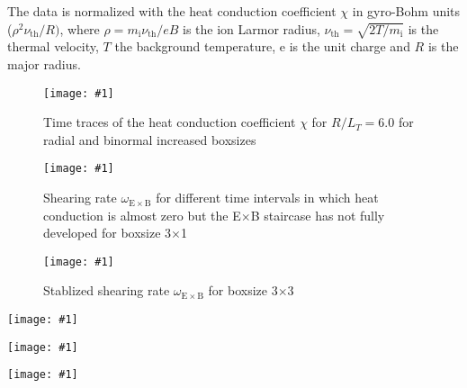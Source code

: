 \documentclass[aip, amsmath, amssymb, reprint, twocolumn]{revtex4-1}
\newcommand{\includegraphicsOneCol}[3]{
	\begin{figure}[ht]
		\texttt{[image: \#1]}
		\caption{#2}
  	\end{figure}
	\label{#3}
  	\increasecounter{fig}{1}
}
\newcommand{\includegraphicsTwoCol}[3]{
	\begin{figure*}
    	\texttt{[image: \#1]}
		\caption{#2}
	\end{figure*}
	\label{#3}
	\increasecounter{fig}{2}
}
\begin{document}


The data is normalized with the heat conduction coefficient $\chi$ in gyro-Bohm units ($\rho^2\nu_{\mathrm{th}}/R)$, where $\rho = m_\mathrm{i}\nu_{\mathrm{th}}/eB$ is the ion Larmor radius, $\nu_{\mathrm{th}} = \sqrt{2T/m_\mathrm{i}}$ is the thermal velocity, $T$ the background temperature, e is the unit charge and $R$ is the major radius. 

\includegraphicsOneCol{Comparison/Boxsize/S6_rlt6.0_boxsize1x1-2x2-3x3_Ns16_Nvpar48_Nmu9_eflux_comparison.pdf}{
	Time traces of the heat conduction coefficient $\chi$ for $R/L_T = 6.0$ for radial and binormal increased boxsizes
}{fig:eflux-1x1-2x2-3x3-comparison}

\includegraphicsOneCol{S6_rlt6.0/boxsize3x1/Ns16/Nvpar48/Nmu9/S6_rlt6.0_boxsize3x1_Ns16_Nvpar48_Nmu9_wexb_selection.pdf}{
	Shearing rate $\omega_{\mathrm{E \times B}}$ for different time intervals in which heat conduction is almost zero but the E$\times$B staircase has not fully developed for boxsize 3$\times$1
}{fig:wexb-3x1-selection}

\includegraphicsOneCol{S6_rlt6.0/boxsize3x3/Ns16/Nvpar48/Nmu9/S6_rlt6.0_boxsize3x3_Ns16_Nvpar48_Nmu9_wexb_selection.pdf}{
	Stablized shearing rate $\omega_{\mathrm{E \times B}}$ for boxsize 3$\times$3
}{fig:wexb-3x3-stable}

\includegraphicsTwoCol{Comparison/Boxsize/S6_rlt6.0_boxsize2x1-2-3x1-3_Ns16_Nvpar48_Nmu9_eflux_comparison.pdf}{
	Comparison of time traces of the heat conduction coefficient $\chi$ for $R/L_T = 6.0$ for boxsize 2$\times$1 compared to 2$\times$2 and 3$\times$1 compared to 3$\times$3
}{fig:eflux-2x1-2-3x1-3-comparison}

\includegraphicsTwoCol{Comparison/Boxsize/S6_rlt6.0_boxsize1-2-3-4x1_Ns16_Nvpar48_Nmu9_wexb_comparison.pdf}{
	Comparison of shearing rate $\omega_{\mathrm{E \times B}}$ for radial increased boxsizes. The staircase structure got 
	shifted for better visibility.
}{fig:wexb-1-2-3-4x1-stable-comparison}

\includegraphicsTwoCol{Comparison/Boxsize/S6_rlt6.0_boxsize1-2-3-4x1_Ns16_Nvpar48_Nmu9_comparison.pdf}{
	\textbf{(a)} Time traces of the heat conduction coefficient $\chi$ for $R/L_T = 6.0$ for radial increased boxsizes \linebreak
	\textbf{(b)} Time traces of $|\hat{\omega}_{\mathrm{E\times B}}|_{k_\mathrm{i}}$ for radial increased boxsizes
}{fig:wexb-eflux-1-2-3-4x1-comparison}
\end{document}
